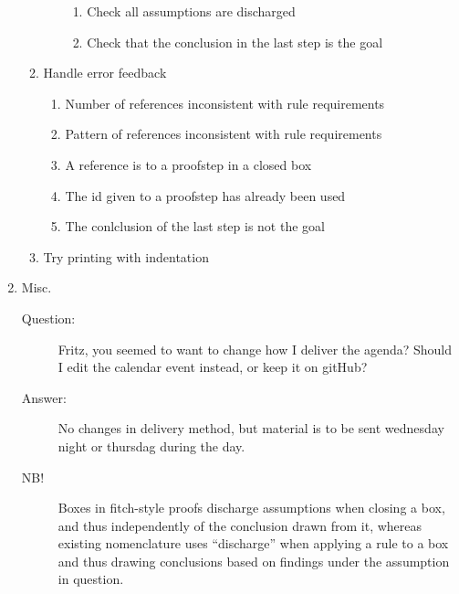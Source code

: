 \documentclass[a4paper]{article}
\begin{document}
\begin{enumerate}
\begin{enumerate}[\HollowBox]
\begin{enumerate}[\HollowBox]
\begin{enumerate}[\HollowBox]
              \item Check all assumptions are discharged
              \item Check that the conclusion in the last step is the goal
            \end{enumerate}
        \end{enumerate}
      \item Handle error feedback
        \begin{enumerate}[\HollowBox]
          \item Number of references inconsistent with rule requirements
          \item Pattern of references inconsistent with rule requirements
          \item A reference is to a proofstep in a closed box
          \item The id given to a proofstep has already been used
          \item The conlclusion of the last step is not the goal
        \end{enumerate}
      \item Try printing with indentation
    \end{enumerate}
  \item Misc.
    \begin{description}
      \item[Question:] Fritz, you seemed to want to change how I deliver the
      agenda?
      Should I edit the calendar event instead, or keep it on gitHub?
      \item[Answer:] No changes in delivery method, but material is to be 
      sent wednesday night or thursdag during the day.
      \item[NB!] Boxes in fitch-style proofs discharge assumptions when
      closing a box, and thus independently of the conclusion drawn from it,
      whereas existing nomenclature uses ``discharge'' when applying a rule
      to a box and thus drawing conclusions based on findings under the
      assumption in question.
    \end{description}
\end{enumerate}
\end{document}
